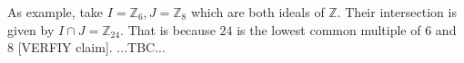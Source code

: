

\medskip
As example, take $I = \mathbb{Z}_6, J = \mathbb{Z}_8$ which are both ideals of $\mathbb{Z}$. Their intersection is given by $I \cap J = \mathbb{Z}_{24}$. That is because $24$ is the lowest common multiple of $6$ and $8$ [VERFIY claim]. ...TBC...

% 


%
%
%
%

